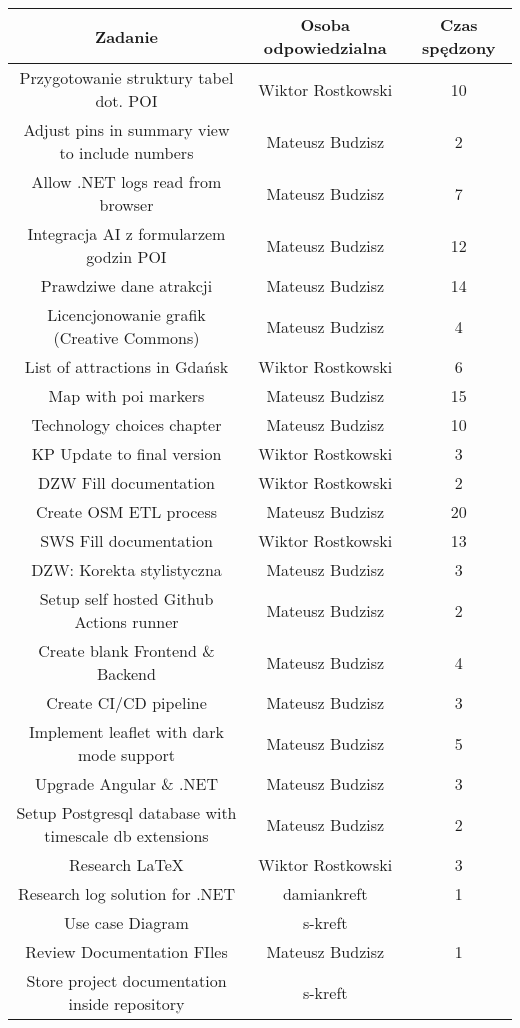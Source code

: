     \begin{table}[h!]
        \centering
        \begin{tabular}{|c|c|c|}
            \hline					
Zadanie	&	Osoba odpowiedzialna	& Czas spędzony\\
\hline
Przygotowanie struktury tabel dot. POI	&	 Wiktor Rostkowski	&	10	\\
Adjust pins in summary view to include numbers	&	Mateusz Budzisz	&	2	\\
Allow .NET logs read from browser	&	Mateusz Budzisz	&	7	\\
Integracja AI z formularzem godzin POI	&	Mateusz Budzisz	&	12	\\
Prawdziwe dane atrakcji	&	Mateusz Budzisz	&	14	\\
Licencjonowanie grafik (Creative Commons)	&	Mateusz Budzisz	&	4	\\
List of attractions in Gdańsk	&	Wiktor Rostkowski	&	6	\\
Map with poi markers	&	Mateusz Budzisz	&	15	\\
Technology choices chapter	&	Mateusz Budzisz	&	10	\\
KP Update to final version	&	Wiktor Rostkowski	&	3	\\
DZW Fill documentation	&	Wiktor Rostkowski	&	2	\\
Create OSM ETL process	&	Mateusz Budzisz	&	20	\\
SWS Fill documentation	&	Wiktor Rostkowski	&	13	\\
DZW: Korekta stylistyczna	&	Mateusz Budzisz	&	3	\\
Setup self hosted Github Actions runner	&	Mateusz Budzisz	&	2	\\
Create blank Frontend \& Backend	&	Mateusz Budzisz	&	4	\\
Create CI/CD pipeline	&	Mateusz Budzisz	&	3	\\
Implement leaflet with dark mode support	&	Mateusz Budzisz	&	5	\\
Upgrade Angular \& .NET	&	Mateusz Budzisz	&	3	\\
Setup Postgresql database with timescale db extensions	&	Mateusz Budzisz	&	2	\\
Research \LaTeX	&	Wiktor Rostkowski	&	3	\\
Research log solution for .NET	&	damiankreft	&	1	\\
Use case Diagram	&	s-kreft	&		\\
Review Documentation FIles	&	Mateusz Budzisz	&	1	\\
Store project documentation inside repository	&	s-kreft	&		\\

\end{tabular}
\end{table}
